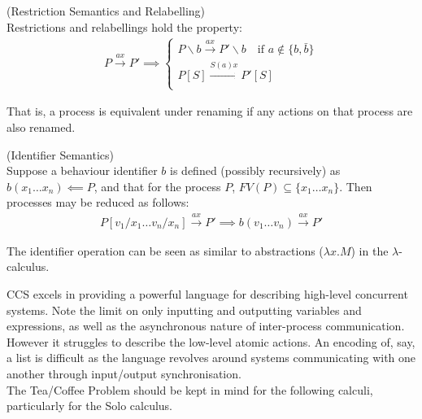     \begin{definition}{(Restriction Semantics and Relabelling)\\}
        Restrictions and relabellings hold the property:
        \begin{align}
            P \xrightarrow{a x} P' \implies
            \begin{cases}
                P \backslash b \xrightarrow{a x} P ' \backslash b \quad \text{if } a \notin \{b, \bar{b}\}\\
                P[S] \xrightarrow{S(a) x} P'[S] \\
            \end{cases}
        \end{align}
    \end{definition}
    That is, a process is equivalent under renaming if any actions on that process are also renamed.


    \begin{definition}{(Identifier Semantics)\\}
        Suppose a behaviour identifier $b$ is defined (possibly recursively) as $b(x_1 \ldots x_n) \impliedby P$, and that for the process $P$, $FV(P) \subseteq \{x_1 \ldots x_n\}$.
        Then processes may be reduced as follows:
        \begin{align}
            P[v_1 / x_1 \ldots v_n / x_n] \xrightarrow{a x} P' \implies
            b(v_1 \ldots v_n) \xrightarrow{a x} P'
        \end{align}
    \end{definition}
    The identifier operation can be seen as similar to abstractions ($\lambda x . M$) in the $\lambda$-calculus.


    \begin{remarks}
        CCS excels in providing a powerful language for describing high-level concurrent systems.
        Note the limit on only inputting and outputting variables and expressions, as well as the asynchronous nature of inter-process communication.
        However it struggles to describe the low-level atomic actions.
        An encoding of, say, a list is difficult as the language revolves around systems communicating with one another through input/output synchronisation. \\

        The Tea/Coffee Problem should be kept in mind for the following calculi, particularly for the Solo calculus.
    \end{remarks}
